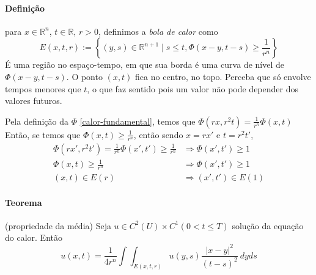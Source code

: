 \documentclass[11pt]{article}
\newcommand{\R}{\mathbb{R}}
\newcommand{\Rn}{{\mathbb{R}^n}}
\begin{document}
\begin{figure}
\end{figure}

\paragraph{Definição} para \(x \in \Rn\), \(t\in\R\), \(r>0\), definimos a \textit{bola de calor} como \[E(x,t,r) := \left\{ (y,s) \in \R^{n+1} \mid s\leq t, \Phi(x-y, t-s) \geq \frac{1}{r^n}  \right\}\] É uma região no espaço-tempo, em que sua borda é uma curva de nível de \(\Phi(x-y, t-s)\). O ponto \((x,t)\) fica no centro, no topo. Perceba que só envolve tempos menores que \(t\), o que faz sentido pois um valor não pode depender dos valores futuros. 

Pela definição da \(\Phi\) \eqref{calor-fundamental}, temos que \(\Phi(rx, r^2t) = \frac{1}{r^n}\Phi(x,t)\)
Então, se temos que \(\Phi(x,t)\geq \frac{1}{r^n}\), então sendo \(x=rx'\) e \(t=r^2t'\), \begin{align*}
	\Phi(rx',r^2 t') = \frac{1}{r^n}\Phi(x',t') \geq \frac{1}{r^n} &\Rightarrow \Phi(x', t')\geq 1\\
	\Phi(x,t)\geq\frac{1}{r^n} &\Rightarrow \Phi(x', t') \geq 1\\
	(x,t) \in E(r) &\Rightarrow (x',t')\in E(1)
\end{align*}
\paragraph{Teorema} (propriedade da média) Seja \(u \in C^2(U)\times C^1(0< t\leq T)\) solução da equação do calor. Então \begin{equation}\label{calor-propmedia}
	u(x,t) = \frac{1}{4r^n} \int \int_{E(x,t,r)} u(y,s) \frac{|x-y|^2}{(t-s)^2}\ dyds
\end{equation}
\end{document}
